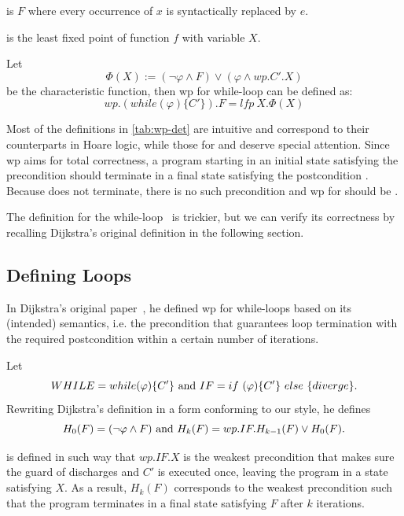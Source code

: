  is $F$ where every occurrence of $x$ is syntactically replaced by $e$. 

 is the least fixed point of function $f$ with variable $X$. 

Let {$$\Phi(X):=(\neg\varphi\wedge F)\vee(\varphi\wedge wp.C'.X)$$} be the characteristic function, then wp for while-loop can be defined as: 
{$$wp.(while(\varphi)\{C'\}).F = lfp\ X. \Phi(X)$$}

Most of the definitions in \autoref{tab:wp-det} are intuitive and correspond to their counterparts in Hoare logic, while those for  and  deserve special attention. 
Since wp aims for total correctness, a program starting in an initial state satisfying the precondition  should terminate in a final state satisfying the postcondition . 
Because  does not terminate, there is no such precondition and wp for  should be . 

The definition for the while-loop~\cite{kaminski19} is trickier, but we can verify its correctness by recalling Dijkstra's original definition in the following section. 


\subsection{Defining Loops}\label{sec:define loops}
In Dijkstra's original paper~\cite{dijkstra75}, he defined wp for while-loops based on its (intended) semantics, i.e. the precondition that guarantees loop termination with the required postcondition within a certain number of iterations. 

Let 
\[
WHILE=while(\varphi)\{C'\}
\\\text{ and } \\ 
IF=  if\ (\varphi)\{C'\}\ else\ \{diverge\}. 
\] 
Rewriting Dijkstra's definition in a form conforming to our style, he defines 
\[
H_0(F)=( \neg \varphi\wedge F )
\\\text{ and } \\ 
H_k(F)=wp.IF.H_{k-1}(F) \vee H_0(F). 
\]

 is defined in such way that $wp.IF.X$ is the weakest precondition that makes sure the guard of  discharges and $C'$ is executed once, leaving the program in a state satisfying $X$.
As a result, $H_k(F)$ corresponds to the weakest precondition such that the program terminates in a final state satisfying $F$ after  $k$ iterations.


